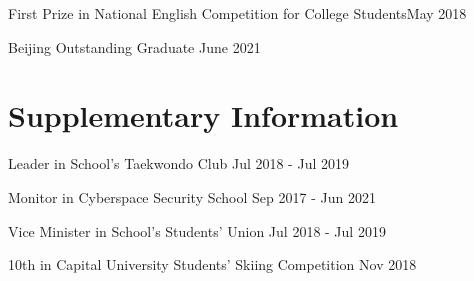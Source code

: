 \documentclass{article}
\begin{document}
\ralewaysb First Prize in National English Competition for College Students\raleway\hfill May 2018

\ralewaysb Beijing Outstanding Graduate \raleway \hfill June 2021

\section{Supplementary Information}
\ralewaysb Leader in School's Taekwondo Club \raleway\hfill Jul 2018 - Jul 2019

\ralewaysb Monitor in Cyberspace Security School  \raleway\hfill Sep 2017 - Jun 2021

\ralewaysb Vice Minister in School's Students' Union  \raleway\hfill Jul 2018 - Jul 2019

\ralewaysb 10th in Capital University Students' Skiing Competition  \raleway\hfill Nov 2018
\end{document}
